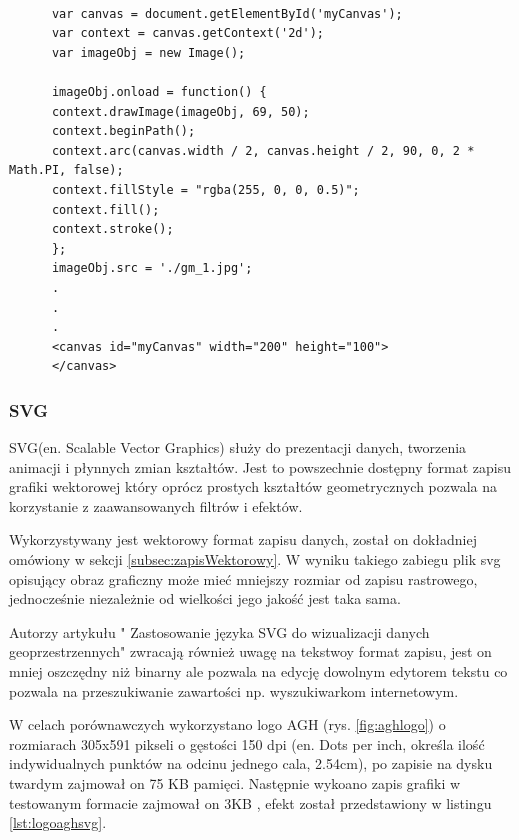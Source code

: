 \lstset{language=JavaScript}
\begin{lstlisting}[label={lst:canvas},caption={json}]

      var canvas = document.getElementById('myCanvas');
      var context = canvas.getContext('2d');
      var imageObj = new Image();
	
      imageObj.onload = function() {
      context.drawImage(imageObj, 69, 50);
	  context.beginPath();
      context.arc(canvas.width / 2, canvas.height / 2, 90, 0, 2 * Math.PI, false);
      context.fillStyle = "rgba(255, 0, 0, 0.5)";
      context.fill();
      context.stroke();
      };
      imageObj.src = './gm_1.jpg';
      .
      .
      .
      <canvas id="myCanvas" width="200" height="100">
      </canvas>
\end{lstlisting}

\subsubsection{SVG}
\label{subsubsec:svg}

SVG(en. Scalable Vector Graphics) służy do prezentacji danych, tworzenia animacji i płynnych zmian kształtów. Jest to powszechnie dostępny format zapisu grafiki wektorowej który oprócz prostych kształtów geometrycznych pozwala na korzystanie z zaawansowanych filtrów i efektów.

Wykorzystywany jest wektorowy format zapisu danych, został on dokładniej omówiony w sekcji \ref{subsec:zapisWektorowy}.
W wyniku takiego zabiegu plik svg opisujący obraz graficzny może mieć mniejszy rozmiar od zapisu rastrowego, jednocześnie niezależnie od wielkości jego jakość jest taka sama.

Autorzy artykułu " Zastosowanie języka SVG do wizualizacji danych geoprzestrzennych" \cite{svgUse} zwracają również uwagę na tekstwoy format zapisu, jest on mniej oszczędny niż binarny ale pozwala na edycję dowolnym edytorem tekstu co pozwala na przeszukiwanie zawartości np. wyszukiwarkom internetowym.

W celach porównawczych wykorzystano logo AGH (rys. \ref{fig:aghlogo}) o rozmiarach 305x591 pikseli o gęstości 150 dpi (en. Dots per inch, określa ilość indywidualnych punktów na odcinu jednego cala, 2.54cm), po zapisie na dysku twardym zajmował on 75 KB pamięci. Następnie wykoano zapis grafiki w testowanym formacie zajmował on 3KB , efekt został przedstawiony w listingu \ref{lst:logoaghsvg}.




